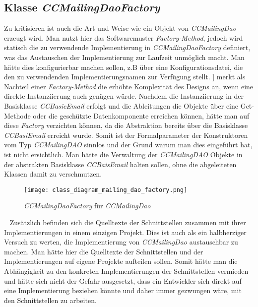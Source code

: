 \subsection{Klasse \emph{CCMailingDaoFactory}}
Zu kritisieren ist auch die Art und Weise wie ein Objekt von \emph{CCMailingDao} erzeugt wird. Man nutzt hier das Softwaremuster \emph{Factory-Method}, jedoch wird statisch die zu verwendende Implementierung in \emph{CCMailingDaoFactory} definiert, was das Austauschen der Implementierung zur Laufzeit unmöglich macht. Man hätte dies konfigurierbar machen sollen, z.B über eine Konfigurationsdatei, die den zu verwendenden Implementierungsnamen zur Verfügung stellt.
\newline 
\newline
[\cite[72]{refactoreToPatterns}] merkt als Nachteil einer \emph{Factory-Method} die erhöhte Komplexität des Designs an, wenn eine direkte Instanziierung auch genügen würde. Nachdem die Instanziierung in der Basisklasse \emph{CCBasicEmail} erfolgt und die Ableitungen die Objekte über eine Get-Methode oder die geschützte Datenkomponente erreichen können, hätte man auf diese \emph{Factory} verzichten können, da die Abstraktion bereits über die Basisklasse \emph{CCBasiEmail} erreicht wurde. Somit ist der Formalparameter der Konstruktoren vom Typ \emph{CCMailingDAO} sinnlos und der Grund warum man dies eingeführt hat, ist nicht ersichtlich. Man hätte die Verwaltung der \emph{CCMailingDAO} Objekte in der abstrakten Basisklasse \emph{CCBaisEmail} halten sollen, ohne die abgeleiteten Klassen damit zu verschmutzen. 
\begin{figure}[h]
\centering
\texttt{[image: class\_diagram\_mailing\_dao\_factory.png]} 
\caption{\emph{CCMailingDaoFactory} für \emph{CCMailingDao}}
\label{fig:klassen-hierarchie-ccmailingfactory}
\end{figure}
\ \newline 
Zusätzlich befinden sich die Quelltexte der Schnittstellen zusammen mit ihrer Implementierungen in einem einzigen Projekt. Dies ist auch als ein halbherziger Versuch zu werten, die Implementierung von \emph{CCMailingDao} austauschbar zu machen. Man hätte hier die Quelltexte der Schnittstellen und der Implementierungen auf eigene Projekte aufteilen sollen. Somit hätte man die Abhängigkeit zu den konkreten Implementierungen der Schnittstellen vermieden und hätte sich nicht der Gefahr ausgesetzt, dass ein Entwickler sich direkt auf eine Implementierung beziehen könnte und daher immer gezwungen wäre, mit den Schnittstellen zu arbeiten.

